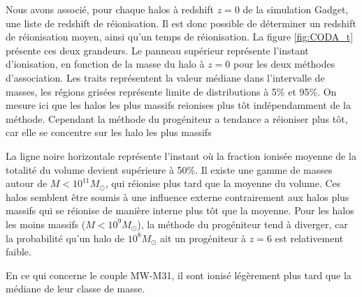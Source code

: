 Nous avons associé, pour chaque halos à redshift $z=0$ de la simulation Gadget, une liste de redshift de réionisation.
Il est donc possible de déterminer un redshift de réionisation moyen, ainsi qu'un temps de réionisation.
La figure \ref{fig:CODA_t} présente ces deux grandeurs.
Le panneau supérieur représente l'instant d'ionisation, en fonction de la masse du halo à $z=0$ pour les deux méthodes d'association.
Les traits représentent la valeur médiane dans l'intervalle de masses, les régions grisées représente limite de distributions à 5\% et 95\%.
On mesure ici que les halos les plus massifs reionises plus tôt indépendamment de la méthode.
Cependant la méthode du progéniteur a tendance a réioniser plus tôt, car elle se concentre sur les halo les plus massifs


La ligne noire horizontale représente l'instant où la fraction ionisée moyenne de la totalité du volume devient supérieure à 50\%.
Il existe une gamme de masses autour de $M <10^{11} M_\odot$, qui réionise plus tard que la moyenne du volume.
Ces halos semblent être soumis à une influence externe contrairement aux halos plus massifs qui se réionise de manière interne plus tôt que la moyenne.
Pour les halos les moins massifs ($M<10^9 M_\odot$), la méthode du progéniteur tend à diverger, car la probabilité qu'un halo de $10^8 M_\odot$ ait un progéniteur à $z=6$ est relativement faible.

En ce qui concerne le couple MW-M31, il sont ionisé légèrement plus tard que la médiane de leur classe de masse.


